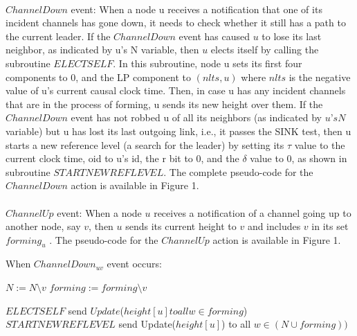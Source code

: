 \paragraph{}$ChannelDown$ event: When a node u receives a notification that one of its incident channels has gone down, it needs to check whether it still has a path to the current leader. If the $ChannelDown$ event has caused $u$ to lose its last neighbor, as indicated by u’s N variable, then $u$ elects itself by calling the subroutine $ELECTSELF$. In this subroutine, node u sets its first four components to 0, and the LP component to $(nlts,u)$ where $nlts$ is the negative value of u’s current causal clock time. Then, in case u has any incident channels that are in the process of forming, u sends its new height over them. If the $ChannelDown$ event has not robbed u of all its neighbors (as indicated by $u’s N$ variable) but u has lost its last outgoing link, i.e., it passes the SINK test, then u starts a new reference level (a search for the leader) by setting its $\tau$ value to the current clock time, oid to u’s id, the r bit to 0, and the $\delta$ value to $0$, as shown in subroutine $STARTNEWREFLEVEL$. The complete pseudo-code for the $ChannelDown$ action is available in Figure 1.

\paragraph{}$ChannelUp$ event: When a node $u$ receives a notification of a channel going up to another node, say $v$, then $u$ sends its current height to $v$ and includes $v$ in its set $forming_u$ . The pseudo-code for the $ChannelUp$ action is available in Figure 1.

\begin{algorithm}
	\caption{When $ChannelDown_{uv}$ event occurs:}
	\begin{algorithmic}[1]
		
		\State $N := N \setminus {v}$
		\State $forming := forming \setminus {v}$
		
		\State $ELECTSELF$
		\State send $Update$($height[u] to all w\in forming$)
		\State $STARTNEWREFLEVEL$
		\State send Update($height[u]$) to all $w \in (N \cup forming))$
		\EndIf
		
		
	\end{algorithmic}

\end{algorithm}

